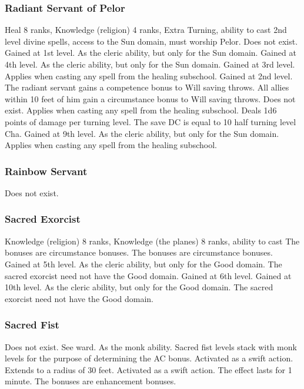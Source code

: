 \subsubsection{Radiant Servant of Pelor}
 Heal 8 ranks, Knowledge (religion) 4 ranks, Extra Turning, ability to cast 2nd level divine spells, access to the Sun domain, must worship Pelor.
 Does not exist.
 Gained at 1st level. As the cleric ability, but only for the Sun domain.
 Gained at 4th level. As the cleric ability, but only for the Sun domain.
 Gained at 3rd level. Applies when casting any spell from the healing subschool.
 Gained at 2nd level. The radiant servant gains a  competence bonus to Will saving throws. All allies within 10 feet of him gain a  circumstance bonus to Will saving throws.
 Does not exist.
 Applies when casting any spell from the healing subschool.
 Deals 1d6 points of damage per turning level. The save DC is equal to 10 \add half turning level \add Cha.
 Gained at 9th level. As the cleric ability, but only for the Sun domain.
 Applies when casting any spell from the healing subschool.
\subsubsection{Rainbow Servant}
Does not exist.
\subsubsection{Sacred Exorcist}
 Knowledge (religion) 8 ranks, Knowledge (the planes) 8 ranks, ability to cast 
 The bonuses are circumstance bonuses.
 The bonuses are circumstance bonuses.
 Gained at 5th level. As the cleric ability, but only for the Good domain. The sacred exorcist need not have the Good domain.
 Gained at 6th level.
 Gained at 10th level. As the cleric ability, but only for the Good domain. The sacred exorcist need not have the Good domain.
\subsubsection{Sacred Fist}
 Does not exist. See \ki ward.
 As the monk ability. Sacred fist levels stack with monk levels for the purpose of determining the AC bonus.
 Activated as a swift action.
 Extends to a radius of 30 feet.
 Activated as a swift action. The effect lasts for 1 minute. The bonuses are enhancement bonuses.
